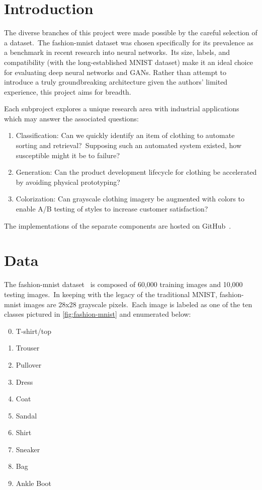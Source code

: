 \documentclass[conference]{IEEEtran}
\begin{document}
    \section{Introduction}\label{sec:introduction}

    The diverse branches of this project were made possible by the careful selection of a dataset.\ The fashion-mnist dataset was chosen specifically for its prevalence as a benchmark in recent research into neural networks.\ Its size, labels, and compatibility (with the long-established MNIST dataset) make it an ideal choice for evaluating deep neural networks and GANs. Rather than attempt to introduce a truly groundbreaking architecture given the authors' limited experience, this project aims for breadth.

    Each subproject explores a unique research area with industrial applications which may answer the associated questions:

    \begin{enumerate}
        \item Classification: Can we quickly identify an item of clothing to automate sorting and retrieval?\ Supposing such an automated system existed, how susceptible might it be to failure?
        \item Generation: Can the product development lifecycle for clothing be accelerated by avoiding physical prototyping?
        \item Colorization: Can grayscale clothing imagery be augmented with colors to enable A/B testing of styles to increase customer satisfaction?
    \end{enumerate}

    The implementations of the separate components are hosted on GitHub~\cite{e-in-style,pytorch-generative-model-collections}.

    \section{Data}\label{sec:data}

    The fashion-mnist dataset~\cite{xiao2017/online} is composed of 60,000 training images and 10,000 testing images.\ In keeping with the legacy of the traditional MNIST, fashion-mnist images are 28x28 grayscale pixels.\ Each image is labeled as one of the ten classes pictured in \autoref{fig:fashion-mnist} and enumerated below:

    \begin{enumerate}
        \setcounter{enumi}{-1}
        \item T-shirt/top
        \item Trouser
        \item Pullover
        \item Dress
        \item Coat
        \item Sandal
        \item Shirt
        \item Sneaker
        \item Bag
        \item Ankle Boot
    \end{enumerate}
\end{document}
